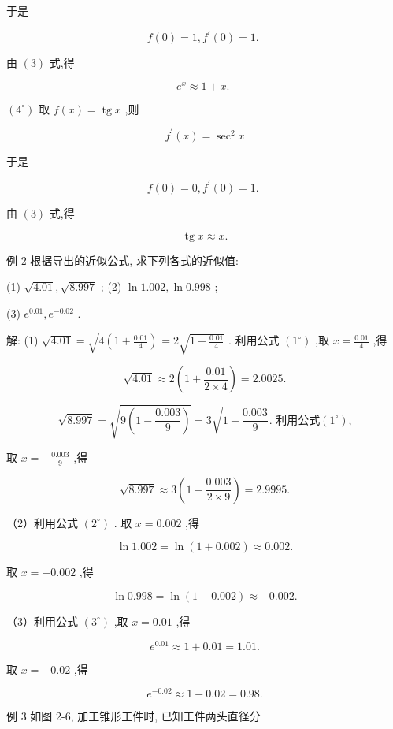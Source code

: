 \documentclass[lang=cn,newtx,10pt,scheme=chinese]{elegantbook}
\begin{document}
于是

\[
f\left( 0\right) = 1,{f}^{\prime }\left( 0\right) = 1\text{. }
\]

由 \(\left( 3\right)\) 式,得

\[
{e}^{x} \approx 1 + x\text{. }
\]

\(\left( {4}^{ \circ }\right)\) 取 \(f\left( x\right) = \operatorname{tg}x\) ,则

\[
{f}^{\prime }\left( x\right) = {\sec }^{2}x
\]

于是

\[
f\left( 0\right) = 0,{f}^{\prime }\left( 0\right) = 1\text{. }
\]

由 \(\left( 3\right)\) 式,得

\[
\operatorname{tg}x \approx x\text{.}
\]

例 2 根据导出的近似公式, 求下列各式的近似值:

(1) \(\sqrt{4.01},\sqrt{8.997}\) ; (2) \(\ln {1.002},\ln {0.998}\) ;

(3) \({e}^{0.01},{e}^{-{0.02}}\) .

解: (1) \(\sqrt{4.01} = \sqrt{4\left( {1 + \frac{0.01}{4}}\right) } = 2\sqrt{1 + \frac{0.01}{4}}\) . 利用公式 \(\left( {1}^{ \circ }\right)\) ,取 \(x = \frac{0.01}{4}\) ,得

\[
\sqrt{4.01} \approx 2\left( {1 + \frac{0.01}{2 \times 4}}\right) = {2.0025}.
\]

\[
\sqrt{8.997} = \sqrt{9\left( {1 - \frac{0.003}{9}}\right) } = 3\sqrt{1 - \frac{0.003}{9}}\text{. 利用公式}\left( {1}^{ \circ }\right) \text{,}
\]

取 \(x = - \frac{0.003}{9}\) ,得

\[
\sqrt{8.997} \approx 3\left( {1 - \frac{0.003}{2 \times 9}}\right) = {2.9995}.
\]

（2）利用公式 \(\left( {2}^{ \circ }\right)\) . 取 \(x = {0.002}\) ,得

\[
\ln {1.002} = \ln \left( {1 + {0.002}}\right) \approx {0.002}\text{.}
\]

取 \(x = - {0.002}\) ,得

\[
\ln {0.998} = \ln \left( {1 - {0.002}}\right) \approx - {0.002}.
\]

（3）利用公式 \(\left( {3}^{ \circ }\right)\) ,取 \(x = {0.01}\) ,得

\[
{e}^{0.01} \approx 1 + {0.01} = {1.01}.
\]

取 \(x = - {0.02}\) ,得

\[
{e}^{-{0.02}} \approx 1 - {0.02} = {0.98}.
\]

例 3 如图 2-6, 加工锥形工件时, 已知工件两头直径分
\end{document}
